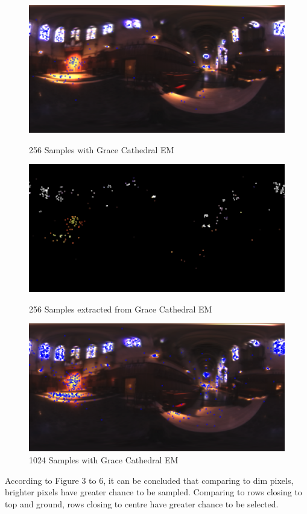 \documentclass[12pt,twoside]{article}
\begin{document}
            \newpage    
            \begin{figure}[H]
        \centering %
            \includegraphics[width = 6in]{./CO417_Figure/MC_256.png} 
            \caption{256 Samples with Grace Cathedral EM} %
            \label{fig:imperial figure} %
 
            \includegraphics[width = 6in]{././CO417_Figure/SAMPLE_MAP_256.png} 
            \caption{256 Samples extracted from Grace Cathedral EM} %
            \label{fig:imperial figure} %

            \includegraphics[width = 6in]{././CO417_Figure/MC_1024.png} 
            \caption{1024 Samples with Grace Cathedral EM} %
            \label{fig:imperial figure} %
        \end{figure}
        
According to Figure 3 to 6, it can be concluded that comparing to dim pixels, brighter pixels have greater chance to be sampled. Comparing to rows closing to top and ground, rows closing to centre have greater chance to be selected. 
      
\end{document}
